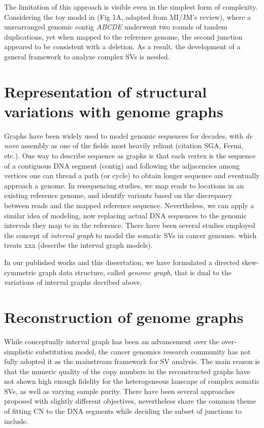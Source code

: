 \documentclass[phd,tocprelim]{cornell}
\begin{document}
The limitation of this approach is visible even in the simplest form of complexity. Considering the toy model in (Fig 1A, adapted from MI/JM's review), where a unrearranged genomic contig \textit{ABCDE} underwent two rounds of tandem duplications, yet when mapped to the reference genome, the second junction appeared to be consistent with a deletion. As a result, the development of a general framework to analyze complex SVs is needed.

\section{Representation of structural variations with genome graphs}
Graphs have been widely used to model genomic sequences for decades, with \textit{de novo} assembly as one of the fields most heavily reliant (citation SGA, Fermi, etc.). One way to describe sequence as graphs is that each vertex is the sequence of a contiguous DNA segment (contig) and following the adjacencies among vertices one can thread a path (or cycle) to obtain longer sequence and eventually approach a genome. In resequencing studies, we map reads to locations in an existing reference genome, and identify variants based on the discrepancy between reads and the mapped reference sequence. Nevertheless, we can apply a similar idea of modeling, now replacing actual DNA sequences to the genomic intervals they map to in the reference. There have been several studies employed the concept of \textit{interval graph} to model the somatic SVs in cancer genomes. which treats xxx (describe the interval graph models). %

In our published works and this dissertation, we have formulated a directed skew-symmetric graph data structure, called \textit{genome graph}, that is dual to the variations of interval graphs decribed above.

\section{Reconstruction of genome graphs}
While conceptually interval graph has been an advancement over the over-simplistic substitution model, the cancer genomics research community has not fully adopted it as the mainstream framework for SV analysis. The main reason is that the numeric quality of the copy numbers in the reconstructed graphs have not shown high enough fidelity for the heterogeneous lanscape of complex somatic SVs, as well as varying sample purity. There have been several approaches proposed with slightly different objectives, nevertheless share the common theme of fitting CN to the DNA segments while deciding the subset of junctions to include. %
\end{document}

